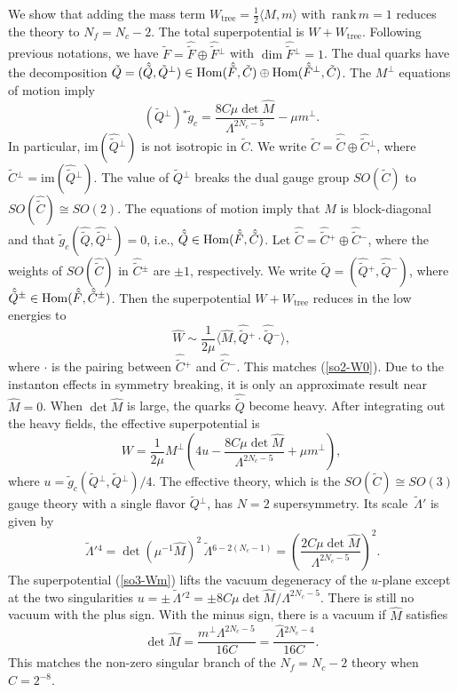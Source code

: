 \documentclass[lecture]{qft-l}
\newcommand{\Lam}{\varLambda}
\newcommand{\Hom}{{\rm Hom}}
\newcommand{\bra}{\langle}
\newcommand{\ket}{\rangle}
\newcommand{\inv}[1]{\frac{1}{#1}}
\newcommand{\hf}{{\textstyle \inv{2}}}
\newcommand{\rank}{\mathrm{\,rank\,}}
\newcommand{\im}{\mathrm{im}}
\newcommand{\tree}{_\mathrm{tree}}
\newcommand{\hLam}{\,\hat{\!\Lam}{}}
\newcommand{\tLam}{\,\tilde{\!\Lam}{}}
\newcommand{\tC}{\tilde{C}{}}
\newcommand{\tF}{\tilde{F}{}}
\newcommand{\tQ}{\tilde{Q}{}}
\newcommand{\htC}{\hat{\tilde{C}}{}}
\newcommand{\htF}{\hat{\tilde{F}}{}}
\newcommand{\htQ}{\hat{\tilde{Q}}{}}
\newcommand{\hM}{\hat{M}{}}
\begin{document}
We show that adding the mass term $W\tree=\hf\bra M,m\ket$ with $\rank m=1$
reduces the theory to $N_f=N_c-2$.
The total superpotential is $W+W\tree$.
Following previous notations, we have $\tF=\htF\oplus\htF^\perp$
with $\dim\htF^\perp=1$.
The dual quarks have the decomposition
$\tQ=(\htQ,\tQ^\perp)\in\Hom(\htF,\tC)\oplus\Hom(\htF^\perp,\tC)$.
The $M^\perp$ equations of motion imply
	\begin{equation}
(\tQ^\perp){}^*\tilde{g}_c=\frac{8C\mu\det\hM}{\Lam^{2N_c-5}}-\mu m^\perp.
	\end{equation}
In particular, $\im(\htQ^\perp)$ is not isotropic in $\tC$.
We write $\tC=\htC\oplus\htC^\perp$, where $\htC^\perp=\im(\htQ^\perp)$.
The value of $\tQ^\perp$ breaks the dual gauge group $SO(\tC)$ to
$SO(\htC)\cong SO(2)$.
The equations of motion imply that $M$ is block-diagonal and that 
$\tilde{g}_c(\htQ,\htQ^\perp)=0$, i.e., $\htQ\in\Hom(\htF,\htC)$.
Let $\htC=\htC^+\oplus\htC^-$, where the weights of $SO(\htC)$ in $\htC^\pm$
are $\pm1$, respectively.
We write $\htQ=(\htQ^+,\htQ^-)$, where $\htQ^\pm\in\Hom(\htF,\htC^\pm)$.
Then the superpotential $W+W\tree$ reduces in the low energies to
	\begin{equation}
\hat{W}\sim\inv{2\mu}\bra\hM,\htQ^+\!\cdot\htQ^-\ket,
	\end{equation}
where $\cdot$ is the pairing between $\htC^+$ and $\htC^-$.
This matches (\ref{so2-W0}).
Due to the instanton effects in symmetry breaking,
it is only an approximate result near $\hM=0$.
When $\det\hM$ is large, the quarks $\htQ$ become heavy.
After integrating out the heavy fields, the effective superpotential is
	\begin{equation}\label{so3-Wm}
W=\inv{2\mu}M^\perp
\left(4u-\frac{8C\mu\det\hM}{\Lam^{2N_c-5}}+\mu m^\perp\right),
	\end{equation}
where $u=\tilde{g}_c(\tQ^\perp,\tQ^\perp)/4$.
The effective theory, which is the $SO(\tC)\cong SO(3)$ gauge theory with
a single flavor $\tQ^\perp$, has $N=2$ supersymmetry.
Its scale $\tLam'$ is given by
	\begin{equation}
\tLam'{}^4=\det(\mu^{-1}\hM)^2\tLam^{6-2(N_c-1)}
=\left(\frac{2C\mu\det\hM}{\Lam^{2N_c-5}}\right)^2.
	\end{equation}
The superpotential (\ref{so3-Wm}) lifts the vacuum degeneracy of the $u$-plane
except at the two singularities
$u=\pm\tLam'{}^2=\pm8C\mu\det\hM/\Lam^{2N_c-5}$.
There is still no vacuum with the plus sign.
With the minus sign, there is a vacuum if $\hM$ satisfies
	\begin{equation}
\det\hM=\frac{m^\perp\Lam^{2N_c-5}}{16C}=\frac{\hLam^{2N_c-4}}{16C}.
	\end{equation}
This matches the non-zero singular branch of the $N_f=N_c-2$ theory
when $C=2^{-8}$.
\end{document}
